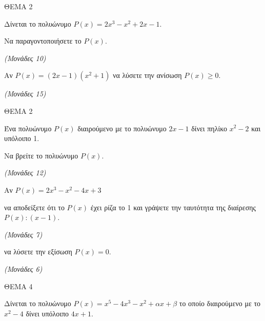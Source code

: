 \documentclass[11pt,a4paper,twoside]{book}
\newcommand{\monades}[1]{\hfill \textit{(Μονάδες #1)}}
\begin{document}
ΘΕΜΑ 2

Δίνεται το πολυώνυμο $P(x) = 2x^3 - x^2 + 2x - 1$.

\begin{alist}
\item Να παραγοντοποιήσετε το $P(x)$.

\monades{10}

\item Αν $P(x) = (2x - 1)(x^2 + 1)$ να λύσετε την ανίσωση $P(x) \ge 0$.

\monades{15}
\end{alist}

\vspace{4mm}

ΘΕΜΑ 2

Ένα πολυώνυμο $P(x)$ διαιρούμενο με το πολυώνυμο $2x - 1$ δίνει πηλίκο $x^2 - 2$ και υπόλοιπο 1.

\begin{alist}
\item Να βρείτε το πολυώνυμο $P(x)$.

\monades{12}

\item Αν $P(x) = 2x^3 - x^2 - 4x + 3$

\begin{rlist}
\item να αποδείξετε ότι το $P(x)$ έχει ρίζα το 1 και γράψετε την ταυτότητα της διαίρεσης $P(x) : (x - 1)$.

\monades{7}

\item να λύσετε την εξίσωση $P(x) = 0$.

\monades{6}
\end{rlist}
\end{alist}

\vspace{4mm}

ΘΕΜΑ 4

Δίνεται το πολυώνυμο $P(x) = x^5 - 4x^3 - x^2 + \alpha x + \beta$ το οποίο διαιρούμενο με το $x^2 - 4$ δίνει υπόλοιπο $4x + 1$.
\end{document}
